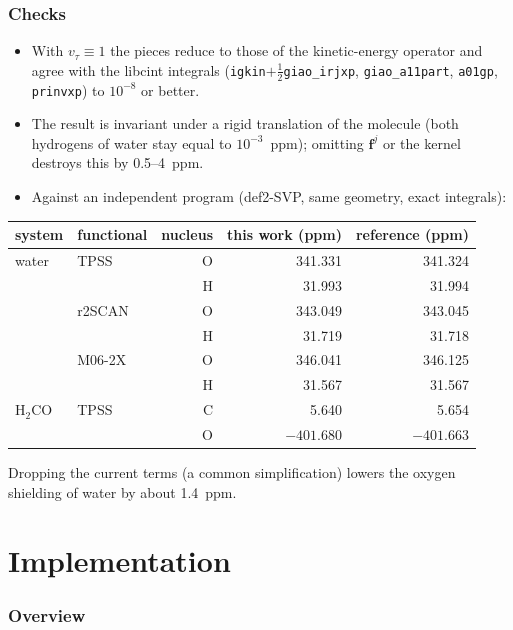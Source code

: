 \documentclass[11pt,a4paper]{article}
\newcommand{\vt}{v_\tau}
\begin{document}
\section{Checks}

\begin{itemize}
\item With $\vt\equiv1$ the pieces reduce to those of the kinetic-energy operator and agree with the libcint integrals (\texttt{igkin}$+\frac12$\texttt{giao\_irjxp}, \texttt{giao\_a11part}, \texttt{a01gp}, \texttt{prinvxp}) to $10^{-8}$ or better.
\item The result is invariant under a rigid translation of the molecule (both hydrogens of water stay equal to $10^{-3}$~ppm); omitting $\bm f^{j}$ or the kernel destroys this by 0.5--4~ppm.
\item Against an independent program (def2-SVP, same geometry, exact integrals):
\end{itemize}

\begin{center}
\begin{tabular}{llrrr}
\toprule
system & functional & nucleus & this work (ppm) & reference (ppm)\\
\midrule
water & TPSS & O & 341.331 & 341.324\\
 & & H & 31.993 & 31.994\\
 & r2SCAN & O & 343.049 & 343.045\\
 & & H & 31.719 & 31.718\\
 & M06-2X & O & 346.041 & 346.125\\
 & & H & 31.567 & 31.567\\
H$_2$CO & TPSS & C & 5.640 & 5.654\\
 & & O & $-401.680$ & $-401.663$\\
\bottomrule
\end{tabular}
\end{center}
Dropping the current terms (a common simplification) lowers the oxygen shielding of water by about 1.4~ppm.

\part{Implementation}

\section{Overview}
\end{document}
